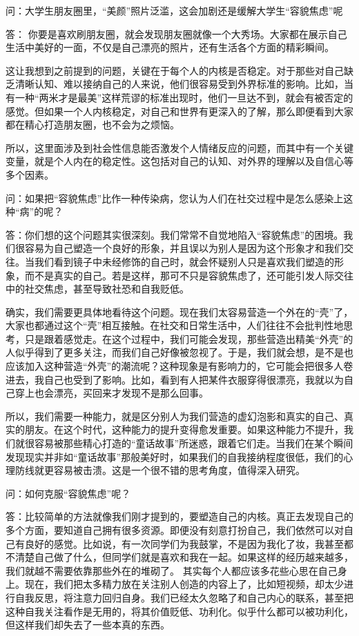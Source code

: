 问：大学生朋友圈里，``美颜''照片泛滥，这会加剧还是缓解大学生``容貌焦虑''呢

答： 你要是喜欢刷朋友圈，就会发现朋友圈就像一个大秀场。大家都在展示自己生活中美好的一面，不仅是自己漂亮的照片，还有生活各个方面的精彩瞬间。

这让我想到之前提到的问题，关键在于每个人的内核是否稳定。对于那些对自己缺乏清晰认知、难以接纳自己的人来说，他们很容易受到外界标准的影响。比如，当有一种``两米才是最美''这样荒谬的标准出现时，他们一旦达不到，就会有被否定的感觉。但如果一个人内核稳定，对自己和世界有更深入的了解，那么即便看到大家都在精心打造朋友圈，也不会为之烦恼。

所以，这里面涉及到社会性信息能否激发个人情绪反应的问题，而其中有一个关键变量，就是个人内在的稳定性。这包括对自己的认知、对外界的理解以及自信心等多个因素。


问：如果把``容貌焦虑''比作一种传染病，您认为人们在社交过程中是怎么感染上这种``病''的呢？

答：你们想的这个问题其实很深刻。我们常常不自觉地陷入``容貌焦虑''的困境。我们很容易为自己塑造一个良好的形象，并且误以为别人是因为这个形象才和我们交往。当我们看到镜子中未经修饰的自己时，就会怀疑别人只是喜欢我们塑造的形象，而不是真实的自己。若是这样，那可不只是容貌焦虑了，还可能引发人际交往中的社交焦虑，甚至导致社恐和自我贬低。

确实，我们需要更具体地看待这个问题。现在我们太容易营造一个外在的``壳''了，大家也都通过这个``壳''相互接触。在社交和日常生活中，人们往往不会批判性地思考，只是跟着感觉走。在这个过程中，我们可能会发现，那些营造出精美``外壳''的人似乎得到了更多关注，而我们自己好像被忽视了。于是，我们就会想，是不是也应该加入这种营造``外壳''的潮流呢？这种现象是有影响力的，它可能会把很多人卷进去，我自己也受到了影响。比如，看到有人把某件衣服穿得很漂亮，我就以为自己穿上也会漂亮，买回来才发现不是那么回事。

所以，我们需要一种能力，就是区分别人为我们营造的虚幻泡影和真实的自己、真实的朋友。在这个时代，这种能力的提升变得愈发重要。如果这种能力不提升，我们就很容易被那些精心打造的``童话故事''所迷惑，跟着它们走。当我们在某个瞬间发现现实并非如``童话故事''那般美好时，如果我们的自我接纳程度很低，我们的心理防线就更容易被击溃。这是一个很不错的思考角度，值得深入研究。


问：如何克服``容貌焦虑''呢？

答：比较简单的方法就像我们刚才提到的，要塑造自己的内核。真正去发现自己的多个方面，要知道自己拥有很多资源。即便没有刻意打扮自己，我们依然可以对自己有良好的感觉。比如说，有一次同学们为我鼓掌，不是因为我化了妆，我甚至都不清楚自己做了什么，但同学们就是喜欢和我在一起。如果这样的经历越来越多，我们就越不需要依靠那些外在的堆砌了。
其实每个人都应该多花些心思在自己身上。现在，我们把太多精力放在关注别人创造的内容上了，比如短视频，却太少进行自我反思，将注意力回归自身。我们已经太久忽略了和自己内心的联系，甚至把这种自我关注看作是无用的，将其价值贬低、功利化。似乎什么都可以被功利化，但这样我们却失去了一些本真的东西。

